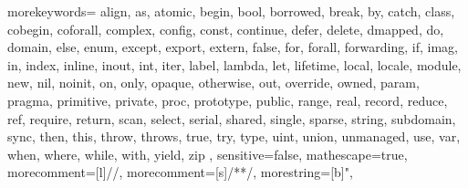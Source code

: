   {
    morekeywords={
      align, as, atomic,
      begin, bool, borrowed, break, by,
      catch, class, cobegin, coforall, complex, config, const, continue,
      defer, delete, dmapped, do, domain,
      else, enum, except, export, extern,
      false, for, forall, forwarding,
      if, imag, in, index, inline, inout, int, iter,
      label, lambda, let, lifetime, local, locale,
      module,
      new, nil, noinit,
      on, only, opaque, otherwise, out, override, owned,
      param, pragma, primitive, private, proc, prototype, public,
      range, real, record, reduce, ref, require, return,
      scan, select, serial, shared, single, sparse, string, subdomain, sync,
      then, this, throw, throws, true, try, type,
      uint, union, unmanaged, use,
      var,
      when, where, while, with,
      yield,
      zip
    },
    sensitive=false,
    mathescape=true,
    morecomment=[l]{//},
    morecomment=[s]{/*}{*/},
    morestring=[b]",
}




\newcommand{\chpl}[1]{\Verb!#1!}
\newcommand{\varname}[1]{\emph{#1}}
\newcommand{\typename}[1]{\emph{#1}}
\newcommand{\fnname}[1]{\chpl{#1}}

\newenvironment{chapel}{BLOCK-chapel}{}
\newenvironment{invisible}{BLOCK-invisible}{}
\newenvironment{chapel0}{BLOCK-chapel}{}
\newenvironment{numberedchapel}{BLOCK-numbered-chapel}{}
\newenvironment{chapelcode}{BLOCK-chapel}{}
\newenvironment{chapelprintoutput}{BLOCK-chapelprintoutput}{}
\newenvironment{commandline}{BLOCK-commandline}{}
\newenvironment{protohead}{BLOCK-protohead}{}
\newenvironment{protobody}{}{}

